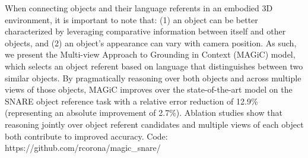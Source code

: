 When connecting objects and their language referents in an embodied 3D environment, it is important to note that: (1) an object can be better characterized by leveraging comparative information between itself and other objects, and (2) an object's appearance can vary with camera position. As such, we present the Multi-view Approach to Grounding in Context (MAGiC) model, which selects an object referent based on language that distinguishes between two similar objects. By pragmatically reasoning over both objects and across multiple views of those objects, MAGiC improves over the state-of-the-art model on the SNARE object reference task with a relative error reduction of 12.9\% (representing an absolute improvement of 2.7\%). Ablation studies show that reasoning jointly over object referent candidates and multiple views of each object both contribute to improved accuracy. Code: https://github.com/rcorona/magic\_snare/
